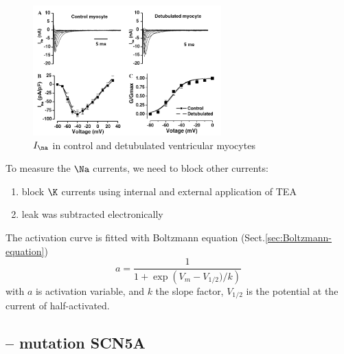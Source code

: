 \begin{figure}[hbt]
  \centerline{\includegraphics[height=5cm,
    angle=0]{./images/Ina_cardiac_brette2006.eps}}
  \caption{$I_\na$ in control and detubulated ventricular myocytes}
  \label{fig:Ina_cardiac_brette2006}
\end{figure}


To measure the $\Na$ currents, we need to block other currents:
\begin{enumerate}
  \item block $\K$ currents using internal and external application of TEA
  \item leak was subtracted electronically
\end{enumerate}


The activation curve is fitted with Boltzmann equation  (Sect.\ref{sec:Boltzmann-equation})
\begin{equation}
\label{eq:Boltzmann-equ}
a = \frac{1}{1+\exp\left( V_m - V_{1/2})/k \right)}
\end{equation}
with $a$ is activation variable, and $k$ the slope factor, $V_{1/2}$ is
the potential at the current of half-activated. 


\subsection{-- mutation SCN5A}

